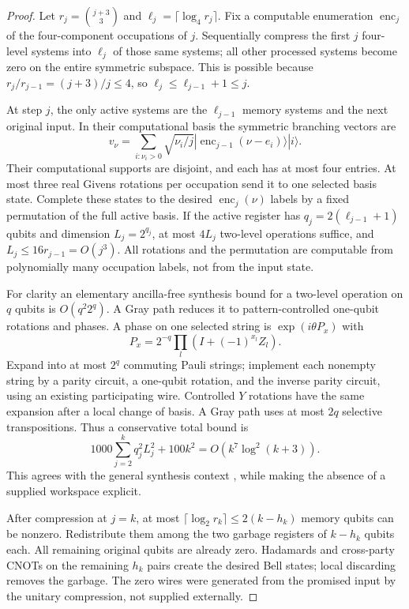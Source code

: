 \begin{proof}
Let $r_j=\binom{j+3}{3}$ and $\ell_j=\lceil\log_4 r_j\rceil$. Fix a computable enumeration $\operatorname{enc}_j$ of the four-component occupations of $j$. Sequentially compress the first $j$ four-level systems into $\ell_j$ of those same systems; all other processed systems become zero on the entire symmetric subspace. This is possible because $r_j/r_{j-1}=(j+3)/j\le4$, so $\ell_j\le\ell_{j-1}+1\le j$.

At step $j$, the only active systems are the $\ell_{j-1}$ memory systems and the next original input. In their computational basis the symmetric branching vectors are
\[
 v_\nu=\sum_{i:\nu_i>0}\sqrt{\nu_i/j}
 |\operatorname{enc}_{j-1}(\nu-e_i)\rangle|i\rangle.
\]
Their computational supports are disjoint, and each has at most four entries. At most three real Givens rotations per occupation send it to one selected basis state. Complete these states to the desired $\operatorname{enc}_j(\nu)$ labels by a fixed permutation of the full active basis. If the active register has $q_j=2(\ell_{j-1}+1)$ qubits and dimension $L_j=2^{q_j}$, at most $4L_j$ two-level operations suffice, and $L_j\le16r_{j-1}=O(j^3)$. All rotations and the permutation are computable from polynomially many occupation labels, not from the input state.

For clarity an elementary ancilla-free synthesis bound for a two-level operation on $q$ qubits is $O(q^2 2^q)$. A Gray path reduces it to pattern-controlled one-qubit rotations and phases. A phase on one selected string is $\exp(i\theta P_x)$ with
\[
 P_x=2^{-q}\prod_l(I+(-1)^{x_l}Z_l).
\]
Expand into at most $2^q$ commuting Pauli strings; implement each nonempty string by a parity circuit, a one-qubit rotation, and the inverse parity circuit, using an existing participating wire. Controlled $Y$ rotations have the same expansion after a local change of basis. A Gray path uses at most $2q$ selective transpositions. Thus a conservative total bound is
\[
 1000\sum_{j=2}^k q_j^2L_j^2+100k^2=O(k^7\log^2(k+3)).
\]
This agrees with the general synthesis context \cite{barenco,shende}, while making the absence of a supplied workspace explicit.

After compression at $j=k$, at most $\lceil\log_2r_k\rceil\le2(k-h_k)$ memory qubits can be nonzero. Redistribute them among the two garbage registers of $k-h_k$ qubits each. All remaining original qubits are already zero. Hadamards and cross-party CNOTs on the remaining $h_k$ pairs create the desired Bell states; local discarding removes the garbage. The zero wires were generated from the promised input by the unitary compression, not supplied externally.


\end{proof}
